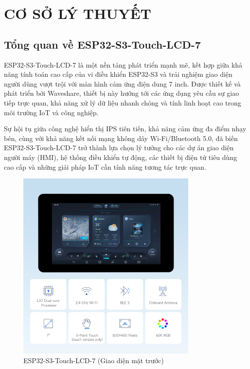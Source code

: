 \chapter{CƠ SỞ LÝ THUYẾT}
\section{Tổng quan về ESP32-S3-Touch-LCD-7}
\tab ESP32-S3-Touch-LCD-7 là một nền tảng phát triển mạnh mẽ, kết hợp giữa khả năng tính toán cao cấp của vi điều khiển ESP32-S3 và trải nghiệm giao diện người dùng vượt trội với màn hình cảm ứng điện dung 7 inch. Được thiết kế và phát triển bởi Waveshare, thiết bị này hướng tới các ứng dụng yêu cầu sự giao tiếp trực quan, khả năng xử lý dữ liệu nhanh chóng và tính linh hoạt cao trong môi trường IoT và công nghiệp.

\tab Sự hội tụ giữa công nghệ hiển thị IPS tiên tiến, khả năng cảm ứng đa điểm nhạy bén, cùng với khả năng kết nối mạng không dây Wi-Fi/Bluetooth 5.0, đã biến ESP32-S3-Touch-LCD-7 trở thành lựa chọn lý tưởng cho các dự án giao diện người máy (HMI), hệ thống điều khiển tự động, các thiết bị điện tử tiêu dùng cao cấp và những giải pháp IoT cần tính năng tương tác trực quan.

\begin{figure}[H] 
  \centering 
  \includegraphics[width=0.8\textwidth]{Images/ESP32-S3-Touch-LCD-7-details-1.jpg} 
  \caption{ESP32-S3-Touch-LCD-7 (Giao diện mặt trước)} 
\end{figure}

